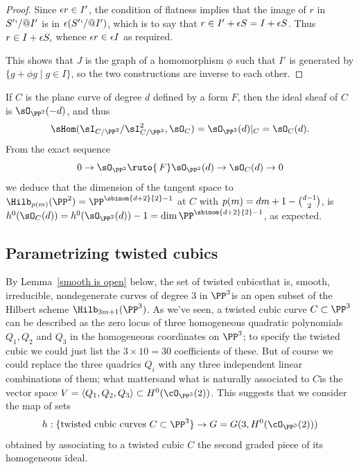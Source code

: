 \begin{proof}
Since $\eps r \in I'$, the condition of flatness implies
that the image of $r$ in $S'`/@I'$ is in $\eps(S'`/@I')$, which is to say
that $r \in I' + \eps S = I +\eps S$.
Thus $r \in  I + \eps S,$ whence $\eps  r \in \eps I$ as required.

This shows that
$J$ is the graph of a homomorphism $\phi$ such that
 $I'$ is generated by $\{g+\phi g\mid g\in I\}$, so the two constructions
 are inverse to
each other.
\end{proof}

\begin{example}
\label{Hilb for plane curves-continued}
If $C$ is the
plane curve
%
of degree $d$ defined by a form $F$, then the
ideal sheaf of $C$ is $\sO_{\PP^2}(-d)$, and thus
$$
\sHom(\sI_{C/\PP^2}/\sI_{C/\PP^2}^2, \sO_{C}) = \sO_{\PP^2}(d)|_C =
\sO_C(d).
$$
From the exact sequence
$$
0\to\sO_{\PP^2}\ruto {\,F}\sO_{\PP^2}(d) \to\sO_C(d)\to 0
$$
we deduce that the dimension of the tangent space to
$\Hilb_{p(m)}(\PP^2)=\PP^{\sbinom{d+2}{2}-1}$  at $C$
with $p(m) = dm+1-\tbinom{d-1}{ 2}$,
is $h^0(\sO_C(d)) = h^0(\sO_{\PP^2}(d))-1 = \dim \PP^{\sbinom{d+2}{2}-1}$,
as expected.
\meshing
\end{example}

\subsection{Parametrizing twisted cubics}

By Lemma~\ref{smooth is open}
below, the set of twisted cubics\emdash that is, smooth, irreducible,
nondegenerate curves of degree 3 in $\PP^3$\emdash is an open subset
of the Hilbert scheme $\Hilb_{3m+1}(\PP^3)$. As we've seen, a twisted
%
cubic curve $C \subset \PP^3$ can be described as the zero locus of
three homogeneous quadratic polynomials $Q_1, Q_2$ and $Q_3$ in the
homogeneous coordinates on $\PP^3$; to specify the twisted cubic
we could just list the $3 \times 10 = 30$ coefficients of these. But
of course we could replace the three quadrics $Q_i$ with any three
independent linear combinations of them; what matters\emdash and what
is naturally associated to $C$\emdash is the vector space $V = \langle
Q_1, Q_2, Q_3 \rangle \subset H^0(\cO_{\PP^3}(2))$. This suggests that
we consider the map of sets
$$
h : \{ \text{twisted cubic curves } C \subset \PP^3 \} \to G = G(3,
H^0(\cO_{\PP^3}(2)))
$$
obtained by associating to a twisted cubic $C$ the second graded piece
of its homogeneous ideal.

